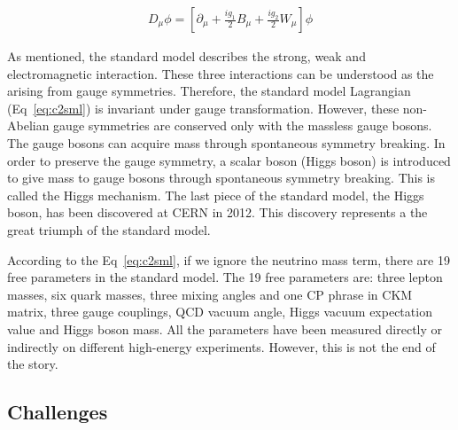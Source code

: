 \begin{equation}
 \begin{aligned}
  D_{\mu}\phi = [\partial_{\mu}+\frac{ig_{1}}{2}B_{\mu}+\frac{ig_{2}}{2}W_{\mu}]\phi
 \end{aligned}
 \label{eq:c2smldh}
\end{equation}

As mentioned, the standard model describes the strong, weak and electromagnetic interaction. These three interactions can be understood as the arising from gauge symmetries\cite{PhysRev.96.191}. Therefore, the standard model Lagrangian (Eq~\ref{eq:c2sml}) is invariant under gauge transformation. However, these non-Abelian gauge symmetries are conserved only with the massless gauge bosons. The gauge bosons can acquire mass through spontaneous symmetry breaking\cite{PhysRevLett.4.380,PhysRev.122.345,PhysRev.124.246}. In order to preserve the gauge symmetry, a scalar boson (Higgs boson) is introduced to give mass to gauge bosons through spontaneous symmetry breaking. This is called the Higgs mechanism\cite{PhysRevLett.13.321,PhysRevLett.13.508}. The last piece of the standard model, the Higgs boson, has been discovered at CERN in 2012\cite{Aad:2012tfa,Chatrchyan:2012xdj}. This discovery represents a the great triumph of the standard model\cite{PhysRevLett.19.1264,PhysRevLett.30.1343,PhysRevLett.30.1346}.

According to the Eq~\ref{eq:c2sml}, if we ignore the neutrino mass term, there are 19 free parameters in the standard model. The 19 free parameters are: three lepton masses, six quark masses, three mixing angles and one CP phrase in CKM matrix\cite{PhysRevLett.10.531,Kobayashi:1973fv}, three gauge couplings, QCD vacuum angle, Higgs vacuum expectation value and Higgs boson mass. All the parameters have been measured directly or indirectly on different high-energy experiments. However, this is not the end of the story. 

\clearpage
\subsection{Challenges}

